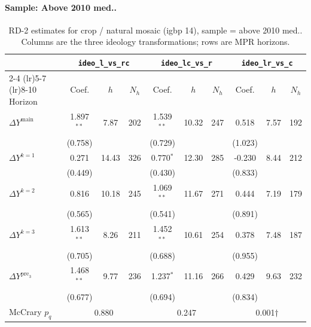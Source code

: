 \documentclass[11pt]{article}
\begin{document}
\paragraph{Sample: Above 2010 med..}
\begin{table}[H]
\centering
\scriptsize
\caption{RD-2 estimates for crop / natural mosaic (igbp 14), sample = above 2010 med..
Columns are the three ideology transformations; rows are MPR horizons.}
\label{tab:rd2_crop_nature_above}
\begin{tabular}{l ccc ccc ccc}
\toprule
 & \multicolumn{3}{c}{\texttt{ideo\_l\_vs\_rc}}
 & \multicolumn{3}{c}{\texttt{ideo\_lc\_vs\_r}}
 & \multicolumn{3}{c}{\texttt{ideo\_lr\_vs\_c}} \\
\cmidrule(lr){2-4} \cmidrule(lr){5-7} \cmidrule(lr){8-10}
Horizon & Coef. & $h$ & $N_h$ & Coef. & $h$ & $N_h$ & Coef. & $h$ & $N_h$ \\
\midrule
$\Delta Y^{\text{main}}$ & 1.897$^{**}$ & 7.87 & 202 & 1.539$^{**}$ & 10.32 & 247 & 0.518 & 7.57 & 192 \\
 & (0.758) &  &  & (0.729) &  &  & (1.023) &  &  \\
\addlinespace[1pt]
$\Delta Y^{k=1}$ & 0.271 & 14.43 & 326 & 0.770$^{*}$ & 12.30 & 285 & -0.230 & 8.44 & 212 \\
 & (0.449) &  &  & (0.430) &  &  & (0.833) &  &  \\
\addlinespace[1pt]
$\Delta Y^{k=2}$ & 0.816 & 10.18 & 245 & 1.069$^{**}$ & 11.67 & 271 & 0.444 & 7.19 & 179 \\
 & (0.565) &  &  & (0.541) &  &  & (0.891) &  &  \\
\addlinespace[1pt]
$\Delta Y^{k=3}$ & 1.613$^{**}$ & 8.26 & 211 & 1.452$^{**}$ & 10.61 & 254 & 0.378 & 7.48 & 187 \\
 & (0.705) &  &  & (0.688) &  &  & (0.955) &  &  \\
\addlinespace[1pt]
$\Delta Y^{\text{pre}_3}$ & 1.468$^{**}$ & 9.77 & 236 & 1.237$^{*}$ & 11.16 & 266 & 0.429 & 9.63 & 232 \\
 & (0.677) &  &  & (0.694) &  &  & (0.834) &  &  \\
\addlinespace[1pt]
\midrule
McCrary $p_q$ & \multicolumn{3}{c}{0.880} & \multicolumn{3}{c}{0.247} & \multicolumn{3}{c}{0.001$\dagger$} \\
\bottomrule
\end{tabular}
\end{table}
\end{document}
